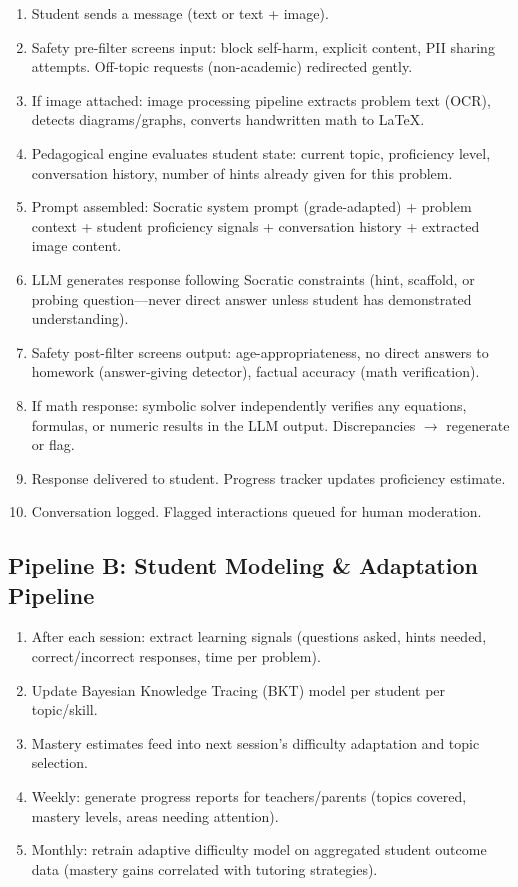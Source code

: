 \begin{enumerate}
  \item Student sends a message (text or text + image).
  \item Safety pre-filter screens input: block self-harm, explicit content, PII sharing attempts. Off-topic requests (non-academic) redirected gently.
  \item If image attached: image processing pipeline extracts problem text (OCR), detects diagrams/graphs, converts handwritten math to LaTeX.
  \item Pedagogical engine evaluates student state: current topic, proficiency level, conversation history, number of hints already given for this problem.
  \item Prompt assembled: Socratic system prompt (grade-adapted) + problem context + student proficiency signals + conversation history + extracted image content.
  \item LLM generates response following Socratic constraints (hint, scaffold, or probing question---never direct answer unless student has demonstrated understanding).
  \item Safety post-filter screens output: age-appropriateness, no direct answers to homework (answer-giving detector), factual accuracy (math verification).
  \item If math response: symbolic solver independently verifies any equations, formulas, or numeric results in the LLM output. Discrepancies $\rightarrow$ regenerate or flag.
  \item Response delivered to student. Progress tracker updates proficiency estimate.
  \item Conversation logged. Flagged interactions queued for human moderation.
\end{enumerate}

\subsection*{Pipeline B: Student Modeling \& Adaptation Pipeline}

\begin{enumerate}
  \item After each session: extract learning signals (questions asked, hints needed, correct/incorrect responses, time per problem).
  \item Update Bayesian Knowledge Tracing (BKT) model per student per topic/skill.
  \item Mastery estimates feed into next session's difficulty adaptation and topic selection.
  \item Weekly: generate progress reports for teachers/parents (topics covered, mastery levels, areas needing attention).
  \item Monthly: retrain adaptive difficulty model on aggregated student outcome data (mastery gains correlated with tutoring strategies).
\end{enumerate}

